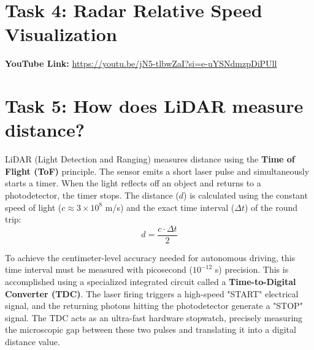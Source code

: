 \documentclass{article}
\begin{document}
\section*{Task 4: Radar Relative Speed Visualization}

\textbf{YouTube Link:} \url{https://youtu.be/jN5-tlbwZaI?si=e-uYSNdmzpDiPUll}

\section*{Task 5: How does LiDAR measure distance?}

LiDAR (Light Detection and Ranging) measures distance using the \textbf{Time of Flight (ToF)} principle. The sensor emits a short laser pulse and simultaneously starts a timer. When the light reflects off an object and returns to a photodetector, the timer stops. The distance ($d$) is calculated using the constant speed of light ($c \approx 3 \times 10^8$ m/s) and the exact time interval ($\Delta t$) of the round trip:
$$ d = \frac{c \cdot \Delta t}{2} $$

To achieve the centimeter-level accuracy needed for autonomous driving, this time interval must be measured with picosecond ($10^{-12}$ s) precision. This is accomplished using a specialized integrated circuit called a \textbf{Time-to-Digital Converter (TDC)}. The laser firing triggers a high-speed "START" electrical signal, and the returning photons hitting the photodetector generate a "STOP" signal. The TDC acts as an ultra-fast hardware stopwatch, precisely measuring the microscopic gap between these two pulses and translating it into a digital distance value.
\end{document}
